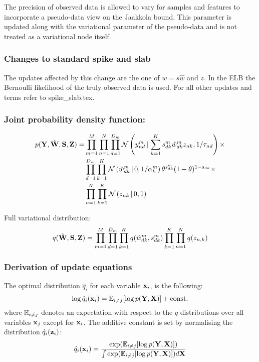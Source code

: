 \documentclass[10pt, a4paper,openany]{paper}
\begin{document}
The precision of observed data is allowed to vary for samples and features to incorporate a pseudo-data view on the Jaakkola bound. This parameter is updated along with the variational parameter of the pseudo-data and is not treated as a variational node itself.




\subsubsection{Changes to standard spike and slab}

The updates affected by this change are the one of $w=s\hat{w}$ and $z$. In the ELB the Bernoulli likelihood of the truly observed data is used.
For all other updates and terms refer to spike\_slab.tex.
\subsubsection{Joint probability density function:}

\begin{align*}
p({\bf Y},\hat{{\bf W}},{\bf S},{\bf Z}) = &\prod_{m=1}^{M} \prod_{n=1}^{N} \prod_{d=1}^{D_m} \mathcal{N}\left(y_{nd}^m \,|\, \sum_{k=1}^{K} s_{dk}^m \hat{w}_{dk}^m z_{nk},1/\tau_{nd}\right) \times \\
&\prod_{d=1}^{D_m}\prod_{k=1}^{K} \mathcal{N}\left(\hat{w}_{dk}^m \,|\, 0,1/\alpha_k^m\right) \theta^{s_{dk}^m}(1-\theta)^{1-s_{dk}} \times \\
&\prod_{n=1}^{N}\prod_{k=1}^{K} \mathcal{N}\left(z_{nk} \,|\, 0,1\right)
\end{align*}

Full variational distribution:
\[
q(\hat{{\bf W}},{\bf S},{\bf Z}) = \prod_{m=1}^{M} \prod_{d=1}^{D_m} \prod_{k=1}^{K} q(\hat{w}_{dk}^m,s_{dk}^m) \prod_{k=1}^{K}\prod_{n=1}^{N} q(z_{n,k})
\]

\subsubsection{Derivation of update equations}
The optimal distribution $\hat{q}_i$ for each variable ${\bf x}_i$, is the following:
\begin{equation} \label{eq:optimal_q_dist}
\log \hat{q}_i({\bf x}_i) = \mathbb{E}_{i \neq j} [\log p({\bf Y},{\bf X})] + {\rm const.}
\end{equation}
where $\mathbb{E}_{i \neq j}$ denotes an expectation with respect to the $q$ distributions over all variables ${\bf x}_j$ except for ${\bf x}_i$.
The additive constant is set by normalising the distribution $\hat{q}_i({\bf z}_i)$:
\[
\hat{q}_i({\bf x}_i) = \frac{\exp(\mathbb{E}_{i \neq j}[\log p({\bf Y},{\bf X})])}{\int \exp(\mathbb{E}_{i \neq j}[\log p({\bf Y},{\bf X})]) d{\bf X}}
\]
\end{document}

